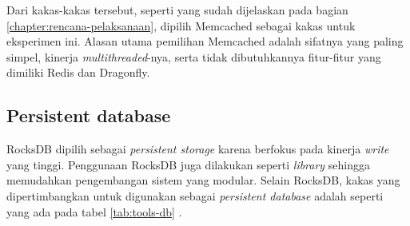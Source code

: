 Dari kakas-kakas tersebut, seperti yang sudah dijelaskan pada bagian \ref{chapter:rencana-pelaksanaan}, dipilih Memcached sebagai kakas untuk eksperimen ini. Alasan utama pemilihan Memcached adalah sifatnya yang paling simpel, kinerja \textit{multithreaded}-nya, serta tidak dibutuhkannya fitur-fitur yang dimiliki Redis dan Dragonfly.

\subsection{Persistent database}
RocksDB dipilih sebagai \textit{persistent storage} karena berfokus pada kinerja \textit{write} yang tinggi. Penggunaan RocksDB juga dilakukan seperti \textit{library} sehingga memudahkan pengembangan sistem yang modular. Selain RocksDB, kakas yang dipertimbangkan untuk digunakan sebagai \textit{persistent database} adalah seperti yang ada pada tabel \ref{tab:tools-db} \parencite{cassandra_docs} \parencite{scylladb_docs} \parencite{rocksdb_docs} \parencite{leveldb_docs} \parencite{mongodb_docs}.

